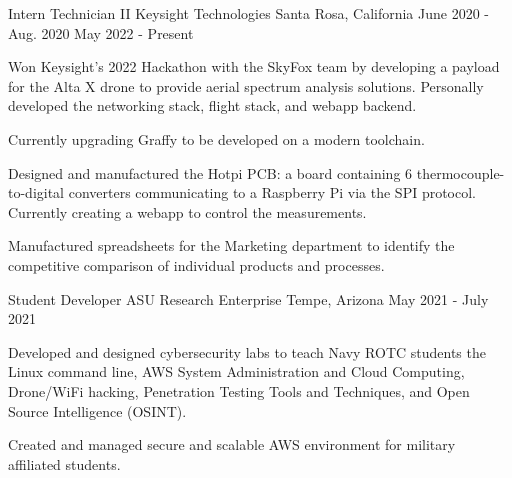 

\begin{cventries}

  \cventry
    {Intern Technician II} %
    {Keysight Technologies} %
    {Santa Rosa, California} %
    {June 2020 - Aug. 2020 May 2022 - Present} %
    {
      \begin{cvitems} %
        \item {Won Keysight's 2022 Hackathon with the SkyFox team by developing a payload for the Alta X drone to provide aerial spectrum analysis solutions. Personally developed the networking stack, flight stack, and webapp backend.}
        \item {Currently upgrading Graffy to be developed on a modern toolchain.}
        \item {Designed and manufactured the Hotpi PCB: a board containing 6 thermocouple-to-digital converters communicating to a Raspberry Pi via the SPI protocol. Currently creating a webapp to control the measurements.}
        \item {Manufactured spreadsheets for the Marketing department to identify the competitive comparison of individual products and processes.}
      \end{cvitems}
    }

  \cventry
    {Student Developer} %
    {ASU Research Enterprise} %
    {Tempe, Arizona} %
    {May 2021 - July 2021} %
    {
      \begin{cvitems} %
        \item {Developed and designed cybersecurity labs to teach Navy ROTC students the Linux command line, AWS System Administration and Cloud Computing, Drone/WiFi hacking, Penetration Testing Tools and Techniques, and Open Source Intelligence (OSINT).}
        \item {Created and managed secure and scalable AWS environment for military affiliated students.}
      \end{cvitems}
    }


\end{cventries}

